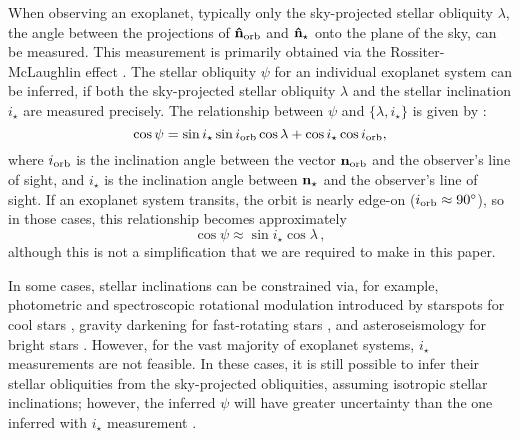\documentclass[twocolumn,times,linenumbers]{aastex631}
\begin{document}
When observing an exoplanet, typically only the sky-projected stellar obliquity $\lambda$, the angle between the projections of $\vb{\hat{n}_{\rm orb}}$ and $\vb{\hat{n}_\star}$ onto the plane of the sky, can be measured. This measurement is primarily obtained via the Rossiter-McLaughlin effect \citep{Rossiter24, McLaughlin24}. The stellar obliquity $\psi$ for an individual exoplanet system can be inferred, if both the sky-projected stellar obliquity $\lambda$ and the stellar inclination $i_\star$ are measured precisely. The relationship between $\psi$ and $\{\lambda, i_\star\}$ is given by \citep[e.g.,][]{Fabrycky09}:
\begin{equation}\label{eqn:psi}
    \cos{\psi} = \sin{i_\star}\sin{i_{\rm orb}}\cos{\lambda} + \cos{i_\star}\cos{i_{\rm orb}},
\end{equation}
where $i_{\rm orb}$ is the inclination angle between the vector $\bf{n}_{\rm orb}$ and the observer's line of sight, and $i_\star$ is the inclination angle between $\bf{n}_{\star}$ and the observer's line of sight.
If an exoplanet system transits, the orbit is nearly edge-on ($i_{\rm orb} \approx 90\mbox{$^\circ$}$), so in those cases, this relationship becomes approximately
\begin{equation}
\cos{\psi} \approx \sin{i_\star}\cos{\lambda}\,,
\end{equation}
although this is not a simplification that we are required to make in this paper.

In some cases, stellar inclinations can be constrained via, for example, photometric and spectroscopic rotational modulation introduced by starspots for cool stars \citep[e.g.,][]{Masuda20, Albrecht21}, gravity darkening for fast-rotating stars \citep[e.g.,][]{Barnes09, Barnes11}, and asteroseismology for bright stars \citep[e.g.][]{Chaplin13}.
However, for the vast majority of exoplanet systems, $i_\star$ measurements are not feasible. In these cases, it is still possible to infer their stellar obliquities from the sky-projected obliquities, assuming isotropic stellar inclinations; however, the inferred $\psi$ will have greater uncertainty than the one inferred with $i_\star$ measurement \citep{Fabrycky09}.
\end{document}
